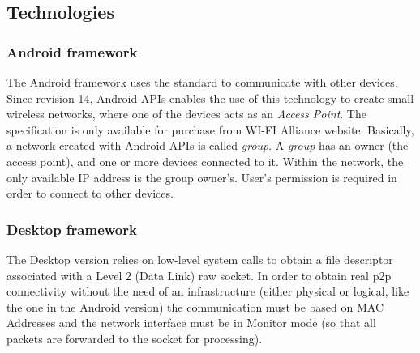 \subsection{Technologies}

\subsubsection{Android framework}
The Android framework uses the \direct standard to communicate with other devices. Since revision 14, Android APIs enables the use of this technology to create small wireless networks, where one of the devices acts as an \emph{Access Point}. The \direct specification is only available for purchase from WI-FI Alliance\textsuperscript{\texttrademark} website\cite{wifi_direct}.
Basically, a network created with Android \direct APIs is called \emph{group}. A \emph{group} has an owner (the access point), and one or more devices connected to it. Within the network, the only available IP address is the group owner's. 
User's permission is required in order to connect to other devices.

\subsubsection{Desktop framework}
The Desktop version relies on low-level system calls to obtain a file descriptor associated with a Level 2 (Data Link) raw socket. In order to obtain real p2p connectivity without the need of an infrastructure (either physical or logical, like the one in the Android version) the communication must be based on MAC Addresses and the network interface must be in Monitor mode (so that all packets are forwarded to the socket for processing).
